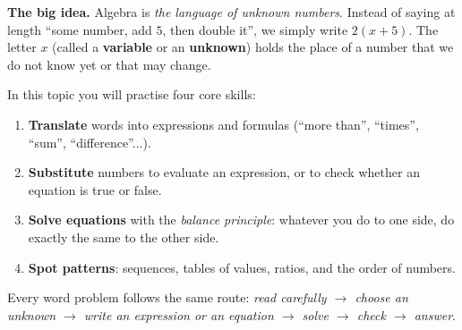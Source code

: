 \begin{knowbox}
\textbf{The big idea.} Algebra is \emph{the language of unknown numbers}. Instead of saying at length
``some number, add $5$, then double it'', we simply write $2(x+5)$. The letter $x$ (called a
\textbf{variable} or an \textbf{unknown}) holds the place of a number that we do not know yet or that may change.

In this topic you will practise four core skills:
\begin{enumerate}[leftmargin=1.4em,itemsep=1pt,topsep=2pt]
\item \textbf{Translate} words into expressions and formulas (``more than'', ``times'', ``sum'', ``difference''...).
\item \textbf{Substitute} numbers to evaluate an expression, or to check whether an equation is true or false.
\item \textbf{Solve equations} with the \emph{balance principle}: whatever you do to one side, do exactly the same to the other side.
\item \textbf{Spot patterns}: sequences, tables of values, ratios, and the order of numbers.
\end{enumerate}
Every word problem follows the same route: \emph{read carefully $\to$ choose an unknown $\to$ write an expression
or an equation $\to$ solve $\to$ check $\to$ answer}.
\end{knowbox}
\vspace{0.3cm}

